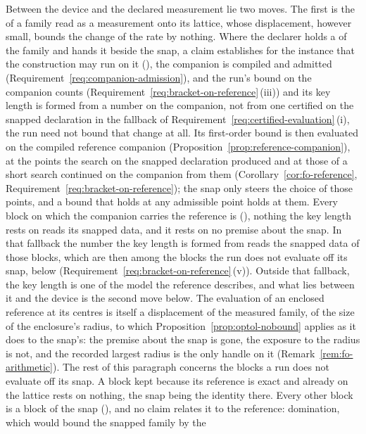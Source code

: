 \begin{remark}
Between the device and the declared measurement lie two moves. The first is
the  of a family read as a measurement onto its lattice, whose
displacement, however small, bounds the change of the rate by nothing.
Where the declarer holds a  of the family and hands it
beside the snap, a claim establishes for the instance that the construction
may run on it (), the companion is
compiled and admitted (Requirement~\ref{req:companion-admission}), and the
run's bound on the companion counts
(Requirement~\ref{req:bracket-on-reference}\,(iii)) and its key length is
formed from a number on the companion, not from one certified on the snapped
declaration in the fallback of
Requirement~\ref{req:certified-evaluation}\,(i), the run need
not bound that change at all. Its first-order bound is then evaluated on the compiled reference companion
(Proposition~\ref{prop:reference-companion}), at the points the search on the
snapped declaration produced and at those of a short search continued on the
companion from them (Corollary~\ref{cor:fo-reference},
Requirement~\ref{req:bracket-on-reference}); the snap only steers the choice
of those points, and a bound that holds at any admissible point holds at
them. Every
block on which the companion carries the reference is
 (),
nothing the key length rests on reads its snapped data, and it rests on no
premise about the snap. In that fallback the number the key length is formed
from reads the snapped data of those blocks, which are then among the blocks
the run does not evaluate off its snap, below
(Requirement~\ref{req:bracket-on-reference}\,(v)). Outside that fallback,
the key length is one of the model the reference describes, and what lies between it and
the device is the second move below. The evaluation of an enclosed
reference at its centres is itself a displacement of the measured family, of
the size of the enclosure's radius, to which
Proposition~\ref{prop:optol-nobound} applies as it does to the snap's: the
premise about the snap is gone, the exposure to the radius is not, and the
recorded largest radius is the only handle on it
(Remark~\ref{rem:fo-arithmetic}). The rest of this paragraph concerns the
blocks a run does not evaluate off its snap. A block kept because its
reference is exact and already on the lattice rests on nothing, the snap
being the identity there. Every other block is a  block of the
snap (), and no claim relates it to the
reference: domination, which would bound the snapped family by the

\end{remark}
